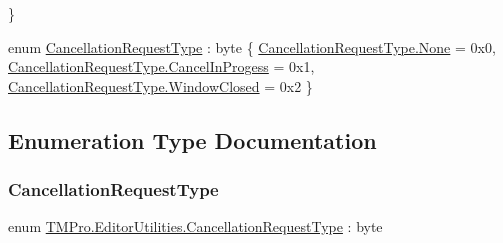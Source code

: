 \begin{DoxyCompactItemize}
 \}
\item 
enum \mbox{\hyperlink{namespace_t_m_pro_1_1_editor_utilities_a6068ba5166378b2acfed3ba6e3031310}{Cancellation\+Request\+Type}} \+: byte \{ \mbox{\hyperlink{namespace_t_m_pro_1_1_editor_utilities_a6068ba5166378b2acfed3ba6e3031310a6adf97f83acf6453d4a6a4b1070f3754}{Cancellation\+Request\+Type.\+None}} = 0x0, 
\mbox{\hyperlink{namespace_t_m_pro_1_1_editor_utilities_a6068ba5166378b2acfed3ba6e3031310ad15e7049369fa58a462ed4e558f5f44d}{Cancellation\+Request\+Type.\+Cancel\+In\+Progess}} = 0x1, 
\mbox{\hyperlink{namespace_t_m_pro_1_1_editor_utilities_a6068ba5166378b2acfed3ba6e3031310a7c87dff2b968b5c85baf1def063c776d}{Cancellation\+Request\+Type.\+Window\+Closed}} = 0x2
 \}
\end{DoxyCompactItemize}


\subsection{Enumeration Type Documentation}
\mbox{\label{namespace_t_m_pro_1_1_editor_utilities_a6068ba5166378b2acfed3ba6e3031310}} 
\subsubsection{\texorpdfstring{CancellationRequestType}{CancellationRequestType}}
{\footnotesize\ttfamily enum \mbox{\hyperlink{namespace_t_m_pro_1_1_editor_utilities_a6068ba5166378b2acfed3ba6e3031310}{T\+M\+Pro.\+Editor\+Utilities.\+Cancellation\+Request\+Type}} \+: byte\hspace{0.3cm}{\ttfamily [strong]}}


